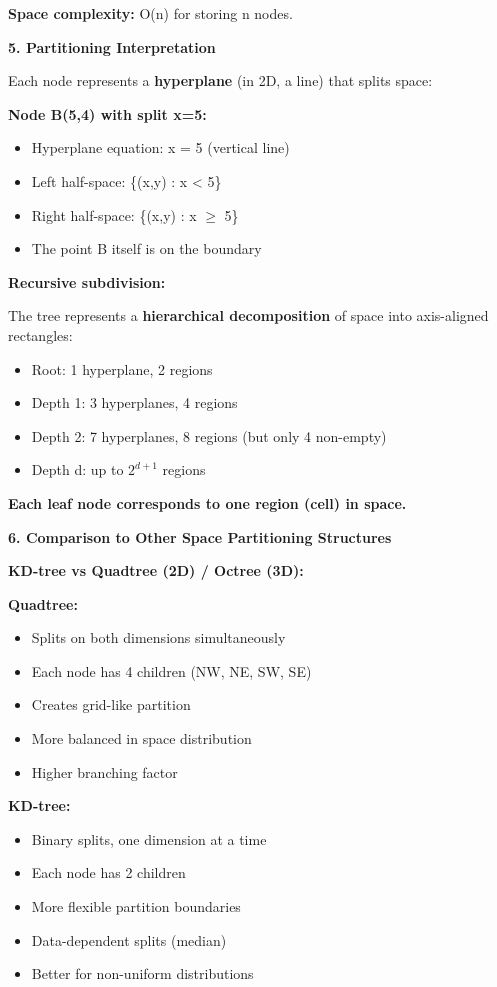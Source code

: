 \documentclass[12pt]{article}
\begin{document}
\begin{explanation}
\textbf{Space complexity:} O(n) for storing n nodes.

\textbf{5. Partitioning Interpretation}

Each node represents a \textbf{hyperplane} (in 2D, a line) that splits space:

\textbf{Node B(5,4) with split x=5:}
\begin{itemize}
    \item Hyperplane equation: x = 5 (vertical line)
    \item Left half-space: \{(x,y) : x < 5\}
    \item Right half-space: \{(x,y) : x $\geq$ 5\}
    \item The point B itself is on the boundary
\end{itemize}

\textbf{Recursive subdivision:}

The tree represents a \textbf{hierarchical decomposition} of space into axis-aligned rectangles:

\begin{itemize}
    \item Root: 1 hyperplane, 2 regions
    \item Depth 1: 3 hyperplanes, 4 regions
    \item Depth 2: 7 hyperplanes, 8 regions (but only 4 non-empty)
    \item Depth d: up to $2^{d+1}$ regions
\end{itemize}

\textbf{Each leaf node corresponds to one region (cell) in space.}

\textbf{6. Comparison to Other Space Partitioning Structures}

\textbf{KD-tree vs Quadtree (2D) / Octree (3D):}

\textbf{Quadtree:}
\begin{itemize}
    \item Splits on both dimensions simultaneously
    \item Each node has 4 children (NW, NE, SW, SE)
    \item Creates grid-like partition
    \item More balanced in space distribution
    \item Higher branching factor
\end{itemize}

\textbf{KD-tree:}
\begin{itemize}
    \item Binary splits, one dimension at a time
    \item Each node has 2 children
    \item More flexible partition boundaries
    \item Data-dependent splits (median)
    \item Better for non-uniform distributions
\end{itemize}


\end{explanation}
\end{document}
